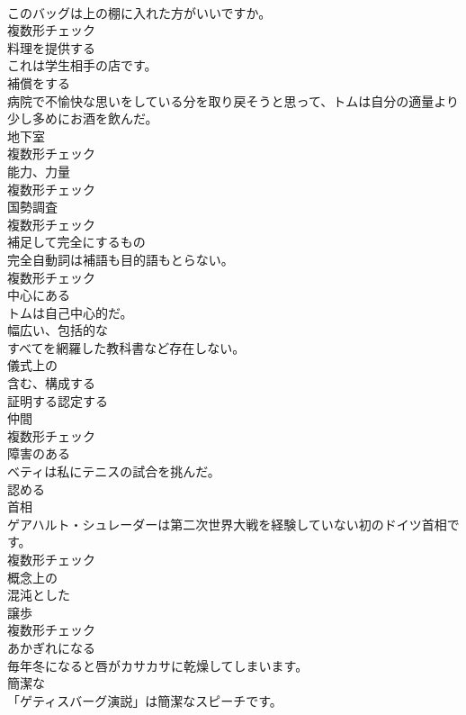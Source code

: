 \documentclass[8pt]{extreport}
\begin{document}
\begin{CJK}{UTF8}{min}
\\	このバッグは上の棚に入れた方がいいですか。	
\\	複数形チェック
\\	[動詞]	料理を提供する	
\\	これは学生相手の店です。	
\\	[動詞]	補償をする	
\\	病院で不愉快な思いをしている分を取り戻そうと思って、トムは自分の適量より少し多めにお酒を飲んだ。	
\\	[名詞]	地下室	
\\	複数形チェック
\\	[名詞]	能力、力量	
\\	複数形チェック
\\	[名詞]	国勢調査	
\\	複数形チェック
\\	[名詞]	補足して完全にするもの	
\\	完全自動詞は補語も目的語もとらない。	
\\	複数形チェック
\\	[形容詞]	中心にある	
\\	トムは自己中心的だ。	
\\	[形容詞]	幅広い、包括的な	
\\	すべてを網羅した教科書など存在しない。	
\\	[形容詞]	儀式上の	
\\	[動詞]	含む、構成する	
\\	[動詞]	証明する認定する	
\\	[名詞]	仲間	
\\	複数形チェック
\\	[形容詞]	障害のある	
\\	ベティは私にテニスの試合を挑んだ。	
\\	[動詞]	認める	
\\	[名詞]	首相	
\\	ゲアハルト・シュレーダーは第二次世界大戦を経験していない初のドイツ首相です。	
\\	複数形チェック
\\	[形容詞]	概念上の	
\\	[形容詞]	混沌とした	
\\	[名詞]	譲歩	
\\	複数形チェック
\\	[動詞]	あかぎれになる	
\\	毎年冬になると唇がカサカサに乾燥してしまいます。	
\\	[形容詞]	簡潔な	
\\	「ゲティスバーグ演説」は簡潔なスピーチです。	

\end{CJK}
\end{document}
